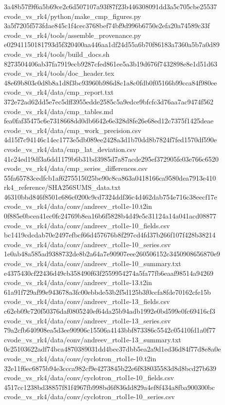 \documentclass[
  10pt,
]{article}
\newenvironment{Shaded}{}{}
\newcommand{\NormalTok}[1]{#1}
\begin{document}
\begin{Shaded}
\begin{Highlighting}[]
\NormalTok{3a48b57f9f6a5b69ce2c6d507107a93f87f23b446308091dd3a5c705cbe25537  cvode\_vs\_rk4/python/make\_cmp\_figures.py}
\NormalTok{3a5f7205f573fdae845c1f4cec3768bef74bf9d996b6750e2efa20a74589c33f  cvode\_vs\_rk4/tools/assemble\_provenance.py}
\NormalTok{e02941150181793d5f320400aa446aa1df24d55a6b70f86183a7360a5b7a0d89  cvode\_vs\_rk4/tools/build\_docs.sh}
\NormalTok{8273504406ab37fa7919ecb9287cfed861ee5a3b19d676f7432898e8e1d51d63  cvode\_vs\_rk4/tools/doc\_header.tex}
\NormalTok{48e69b803c0d8b8a1d8f3bc93960b986d8c1a8c0fdb0f05166b99cca84f980ee  cvode\_vs\_rk4/data/cmp\_report.txt}
\NormalTok{372e72ad62dd5e7ec5dff3955edde2585c5a9edce9bfcfc3d76aa7ac9474f562  cvode\_vs\_rk4/data/cmp\_tables.md}
\NormalTok{fea0faf35475c6e7318668dd0db6642e6e328d8fe26e68ed12c7375f1425deae  cvode\_vs\_rk4/data/cmp\_work\_precision.csv}
\NormalTok{4d15f7c94146c14ec1773e5db089ee2428a3d1b70dd8b7824f7fed1570df590e  cvode\_vs\_rk4/data/cmp\_lat\_deviation.csv}
\NormalTok{41c24ed19df3a6dd1179b6b31bd3985d7a87acde295ef372905fe03e766c6520  cvode\_vs\_rk4/data/cmp\_series\_differences.csv}
\NormalTok{55fa65783cedfcb1af6275515025be90c8ca863a0418166ca9580dea7913e410  rk4\_reference/SHA256SUMS\_data.txt}
\NormalTok{46310bbd846f8501e686c0200c9cd7324ddf36c4d462dab754e716c38eecf17e  cvode\_vs\_rk4/data/conv/andreev\_rtol1e{-}10.t2in}
\NormalTok{0f885e0bcea41ec0fc24769b8ea16b6f5828b4d49e5c31124a14a041acd08877  cvode\_vs\_rk4/data/conv/andreev\_rtol1e{-}10\_fields.csv}
\NormalTok{bc1419cdcdab70e2497efbcf66d457676b8f297cd4fd37b266f107f428b38214  cvode\_vs\_rk4/data/conv/andreev\_rtol1e{-}10\_series.csv}
\NormalTok{1e0ab48a585ad9388732de8b2a64a7e90907eee260506152c3450908656870e9  cvode\_vs\_rk4/data/conv/andreev\_rtol1e{-}10\_summary.txt}
\NormalTok{e4375430cf22436d49cb358490f63f2559954274a5fa77fb6eaaf98514a94269  cvode\_vs\_rk4/data/conv/andreev\_rtol1e{-}13.t2in}
\NormalTok{61a91f729af99e943678a3fc00ebbde53b2f5d125b3f0ccfa8fde70162cfe15b  cvode\_vs\_rk4/data/conv/andreev\_rtol1e{-}13\_fields.csv}
\NormalTok{c62eb09c720f50376daf0805240ef64da25b94adb1992e0bd599e0fc69416cf3  cvode\_vs\_rk4/data/conv/andreev\_rtol1e{-}13\_series.csv}
\NormalTok{79a2cfb640908ea5d3ee90906c15506a4143bbf873386c5542c05410fd1a0f77  cvode\_vs\_rk4/data/conv/andreev\_rtol1e{-}13\_summary.txt}
\NormalTok{0c25103622adf74bca4870389031dd4bec37dbb5ea2a9d1ed36d84f77d8e8a0e  cvode\_vs\_rk4/data/conv/cyclotron\_rtol1e{-}10.t2in}
\NormalTok{32e11f6ec6875b94e3ccca982cf9e4273845b22e6f838035583d8d8bcd27b639  cvode\_vs\_rk4/data/conv/cyclotron\_rtol1e{-}10\_fields.csv}
\NormalTok{4517cc1238bd38857f81f4967fb998bd6f836dd829a4ef8f434a8fba900300bc  cvode\_vs\_rk4/data/conv/cyclotron\_rtol1e{-}10\_series.csv}

\end{Highlighting}
\end{Shaded}
\end{document}
